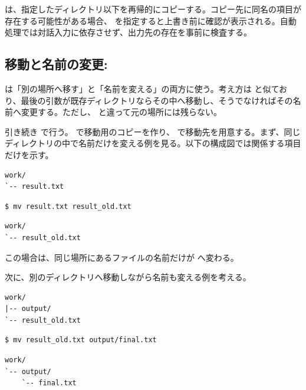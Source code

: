  は、指定したディレクトリ以下を再帰的にコピーする。コピー先に同名の項目が存在する可能性がある場合、 を指定すると上書き前に確認が表示される。自動処理では対話入力に依存させず、出力先の存在を事前に検査する。

\subsection{移動と名前の変更: }

 は「別の場所へ移す」と「名前を変える」の両方に使う。考え方は  と似ており、最後の引数が既存ディレクトリならその中へ移動し、そうでなければその名前へ変更する。ただし、 と違って元の場所には残らない。

引き続き  で行う。 で移動用のコピーを作り、 で移動先を用意する。まず、同じディレクトリの中で名前だけを変える例を見る。以下の構成図では関係する項目だけを示す。

\begin{lstlisting}[numbers=none, xleftmargin=2\zw]
work/
`-- result.txt
\end{lstlisting}

\begin{lstlisting}[numbers=none, xleftmargin=2\zw]
$ mv result.txt result_old.txt
\end{lstlisting}

\begin{lstlisting}[numbers=none, xleftmargin=2\zw]
work/
`-- result_old.txt
\end{lstlisting}

この場合は、同じ場所にあるファイルの名前だけが  へ変わる。

次に、別のディレクトリへ移動しながら名前も変える例を考える。

\begin{lstlisting}[numbers=none, xleftmargin=2\zw]
work/
|-- output/
`-- result_old.txt
\end{lstlisting}

\begin{lstlisting}[numbers=none, xleftmargin=2\zw]
$ mv result_old.txt output/final.txt
\end{lstlisting}

\begin{lstlisting}[numbers=none, xleftmargin=2\zw]
work/
`-- output/
    `-- final.txt
\end{lstlisting}

